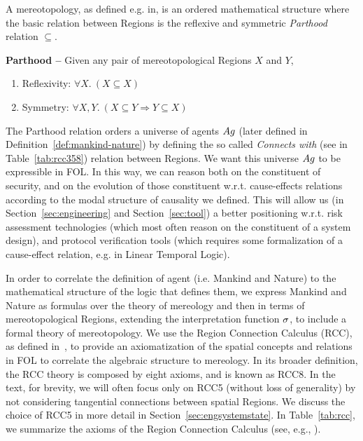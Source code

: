 A mereotopology, as defined e.g. in\autocite{Rachavelpula2017mereotopology},
is an ordered mathematical structure where the basic relation between Regions is the
reflexive and symmetric 
\emph{Parthood} relation $\subseteq$. 
\begin{definition}{\bf Parthood --}\label{def:parthood}
Given any pair of mereotopological Regions $X$ and $Y$,
	\begin{enumerate}[noitemsep]
		\item Reflexivity: $\forall X.~ (X\subseteq X)$
		\item Symmetry: $\forall X, Y.~ (X\subseteq Y \Rightarrow Y\subseteq X)$
	\end{enumerate}
\end{definition}

The Parthood relation orders a universe of agents $Ag$ (later defined in
Definition~\ref{def:mankind-nature}) by defining the so called
\emph{Connects with} (see in Table~\ref{tab:rcc358}) relation between Regions.
We want this universe $Ag$ to be expressible in FOL. In this way,
we can reason both on the constituent of security, and on the evolution of
those constituent w.r.t. cause-effects relations according to the modal
structure of causality we defined.  This will allow us (in
Section~\ref{sec:engineering} and Section~\ref{sec:tool}) a
better positioning w.r.t. risk
assessment technologies (which most often reason on the constituent of a system
design), and protocol verification tools (which requires some formalization of
a cause-effect relation, e.g.  in Linear Temporal Logic).

In order to correlate the definition of
agent (i.e. Mankind and Nature) to the
mathematical structure of the logic that defines them, we express Mankind and
Nature as formulas over the theory of mereology and then in terms of
mereotopological Regions, extending the interpretation function
$\sigma$, to include a formal theory of mereotopology.  We use the
Region Connection Calculus (RCC), as defined
in~\cite{bennettLogics,improvingRCC}, to provide an axiomatization of the
spatial concepts and relations in FOL to correlate the algebraic
structure to mereology. In its broader definition, the RCC theory is composed
by eight axioms, and is known as RCC8. In the text, for brevity, 
we will often focus only on RCC5 (without
loss of generality) by not considering tangential connections between spatial
Regions. We discuss the choice of RCC5 in more detail in
Section~\ref{sec:engsystemstate}. In Table~\ref{tab:rcc}, we
summarize the axioms of the Region Connection Calculus (see, e.g., \autocite{Grutter2008rcc}).

